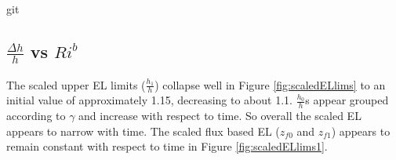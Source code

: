 git
 
   

\subsection{$\frac{\Delta h}{h}$ vs $Ri^{b}$}
\label{subsec:deltahri}
\FloatBarrier

The scaled upper EL limits ($\frac{h_{1}}{h}$) collapse well in Figure \ref{fig:scaledELlims} 
to an initial value of approximately 1.15, decreasing to about 1.1.  $\frac{h_{0}}{h}$s appear 
grouped according to $\gamma$ and increase with respect to time.  So overall the scaled \acs{EL} appears
to narrow with time.   The scaled flux based \acs{EL} ($z_{f0}$ and $z_{f1}$) appears to remain constant 
with respect to time in Figure \ref{fig:scaledELlims1}.\\

